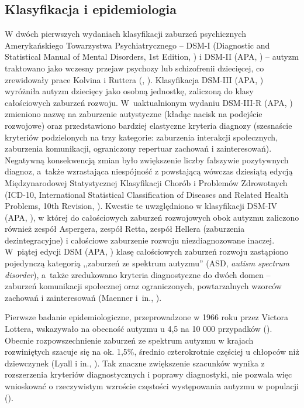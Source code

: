     \subsection{Klasyfikacja i epidemiologia}
    W dwóch pierwszych wydaniach klasyfikacji zaburzeń psychicznych Amerykańskiego Towarzystwa Psychiatrycznego -- DSM-I (Diagnostic and Statistical Manual of Mental Disorders, 1st Edition, \cite{dsm1}) i DSM-II (APA, \cite*{dsm2}) -- autyzm traktowano jako wczesny przejaw psychozy lub schizofrenii dziecięcej, co zrewidowały prace Kolvina i Ruttera (\cite{kolvin1972infantile}, \cite{rutter1972childhood}).
    Klasyfikacja DSM-III (APA, \cite*{dsm3}) wyróżniła autyzm dziecięcy jako osobną jednostkę, zaliczoną do klasy całościowych zaburzeń rozwoju.
    W~uaktualnionym wydaniu DSM-III-R (APA, \cite*{dsm3r}) zmieniono nazwę na zaburzenie autystyczne (kładąc nacisk na podejście rozwojowe) oraz przedstawiono bardziej elastyczne kryteria diagnozy (szesnaście kryteriów podzielonych na trzy kategorie: zaburzenia interakcji społecznych, zaburzenia komunikacji, ograniczony repertuar zachowań i zainteresowań).
    Negatywną konsekwencją zmian było zwiększenie liczby fałszywie pozytywnych diagnoz, a~także wzrastająca niespójność z powstającą wówczas dziesiątą edycją Międzynarodowej Statystycznej Klasyfikacji Chorób i Problemów Zdrowotnych (ICD-10, International Statistical Classification of Diseases and Related Health Problems, 10th Revision, \cite{icd10}).
    Kwestie te uwzględniono w klasyfikacji DSM-IV (APA, \cite*{dsm4}), w której do całościowych zaburzeń rozwojowych obok autyzmu zaliczono również zespół Aspergera, zespół Retta, zespół Hellera (zaburzenia dezintegracyjne) i całościowe zaburzenie rozwoju niezdiagnozowane inaczej.
    W~piątej edycji DSM (APA, \cite*{dsm5}) klasę  całościowych zaburzeń rozwoju zastąpiono pojedynczą kategorią ,,zaburzeń ze spektrum autyzmu'' (ASD, \emph{autism spectrum disorder}), a~także zredukowano kryteria diagnostyczne do dwóch domen -- zaburzeń komunikacji społecznej oraz ograniczonych, powtarzalnych wzorców zachowań i zainteresowań (Maenner i~in., \cite*{maenner2014potential}).
    
    Pierwsze badanie epidemiologiczne, przeprowadzone w 1966 roku przez Victora Lottera, wskazywało na obecność autyzmu u 4,5 na 10 000 przypadków (\cite{lotter1966epidemiology}).
    Obecnie rozpowszechnienie zaburzeń ze spektrum autyzmu w krajach rozwiniętych szacuje się na ok. 1,5\%, średnio czterokrotnie częściej u chłopców niż dziewczynek (Lyall i in., \cite*{lyall2017changing}).
    Tak znaczne zwiększenie szacunków wynika z rozszerzenia kryteriów diagnostycznych i poprawy diagnostyki, nie pozwala więc wnioskować o rzeczywistym wzroście częstości występowania autyzmu w populacji (\cite{frith2008autyzm}).  
    
